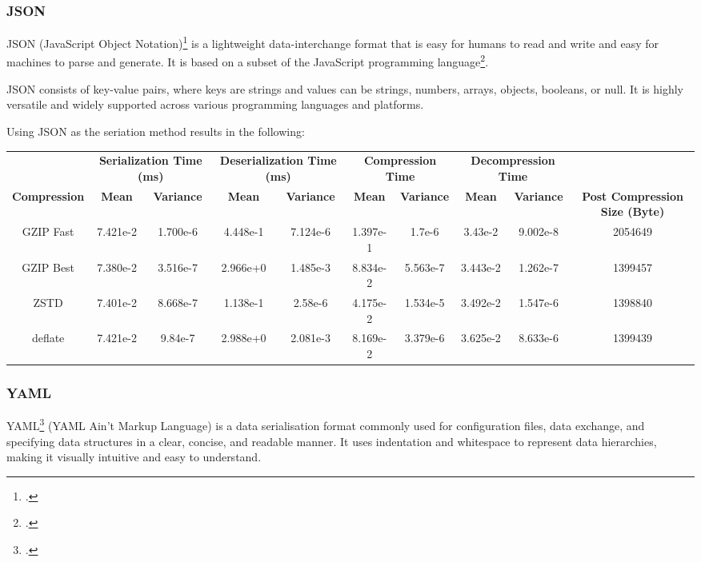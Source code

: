\subsubsection{JSON}
JSON (JavaScript Object Notation)\footcite{json} is a lightweight data-interchange format that is easy for humans to read and write and easy for machines to parse and generate. It is based on a subset of the JavaScript programming language\footcite{javascript}.

JSON consists of key-value pairs, where keys are strings and values can be strings, numbers, arrays, objects, booleans, or null. It is highly versatile and widely supported across various programming languages and platforms.

Using JSON as the seriation method results in the following:

\begin{table}[h]
\centering
\begin{tabular}{cccccccccc}
\hline
 &
  \multicolumn{2}{c}{\textbf{Serialization Time (ms)}} &
  \multicolumn{2}{c}{\textbf{Deserialization Time (ms)}} &
  \multicolumn{2}{c}{\textbf{Compression Time}} &
  \multicolumn{2}{c}{\textbf{Decompression Time}} &
   \\
\textbf{Compression} & \textbf{Mean}     & \textbf{Variance} & \textbf{Mean}     & \textbf{Variance} & \textbf{Mean}     & \textbf{Variance} & \textbf{Mean}     & \textbf{Variance} & \textbf{Post Compression Size (Byte)} \\
\hline
GZIP Fast           & 7.421e-2 & 1.700e-6 & 4.448e-1 & 7.124e-6 & 1.397e-1 & 1.7e-6   & 3.43e-2  & 9.002e-8 & 2054649                               \\
GZIP Best           & 7.380e-2 & 3.516e-7 & 2.966e+0 & 1.485e-3 & 8.834e-2 & 5.563e-7 & 3.443e-2 & 1.262e-7 & 1399457                               \\
ZSTD                & 7.401e-2 & 8.668e-7 & 1.138e-1 & 2.58e-6  & 4.175e-2 & 1.534e-5 & 3.492e-2 & 1.547e-6 & 1398840                               \\
deflate             & 7.421e-2 & 9.84e-7  & 2.988e+0 & 2.081e-3 & 8.169e-2 & 3.379e-6 & 3.625e-2 & 8.633e-6 & 1399439   \\
\hline
\end{tabular}
\end{table}

\subsubsection{YAML}
YAML\footcite{yaml} (YAML Ain't Markup Language) is a data serialisation format commonly used for configuration files, data exchange, and specifying data structures in a clear, concise, and readable manner. It uses indentation and whitespace to represent data hierarchies, making it visually intuitive and easy to understand.

